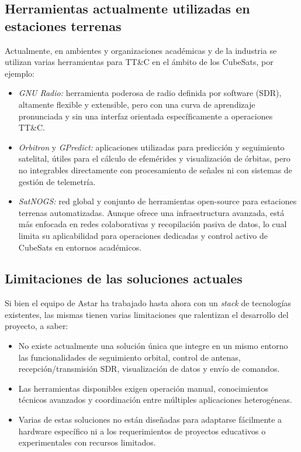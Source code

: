 \subsection*{Herramientas actualmente utilizadas en estaciones terrenas}

Actualmente, en ambientes y organizaciones académicas y de la industria se utilizan varias herramientas para TT\&C en el ámbito de los CubeSats, por ejemplo:

\begin{itemize}
    \item \textit{GNU Radio:} herramienta poderosa de radio definida por software (SDR), altamente flexible y extensible, pero con una curva de aprendizaje pronunciada y sin una interfaz orientada específicamente a operaciones TT\&C.
    
    \item \textit{Orbitron} y \textit{GPredict:} aplicaciones utilizadas para predicción y seguimiento satelital, útiles para el cálculo de efemérides y visualización de órbitas, pero no integrables directamente con procesamiento de señales ni con sistemas de gestión de telemetría.
    
    \item \textit{SatNOGS:} red global y conjunto de herramientas open-source para estaciones terrenas automatizadas. Aunque ofrece una infraestructura avanzada, está más enfocada en redes colaborativas y recopilación pasiva de datos, lo cual limita su aplicabilidad para operaciones dedicadas y control activo de CubeSats en entornos académicos.
\end{itemize}

\subsection*{Limitaciones de las soluciones actuales}

Si bien el equipo de Astar ha trabajado hasta ahora con un \textit{stack} de tecnologías existentes, las mismas tienen varias limitaciones que ralentizan el desarrollo del proyecto, a saber:

\begin{itemize}
    \item No existe actualmente una solución única que integre en un mismo entorno las funcionalidades de seguimiento orbital, control de antenas, recepción/transmisión SDR, visualización de datos y envío de comandos.
    
    \item Las herramientas disponibles exigen operación manual, conocimientos técnicos avanzados y coordinación entre múltiples aplicaciones heterogéneas.
    
    \item Varias de estas soluciones no están diseñadas para adaptarse fácilmente a hardware específico ni a los requerimientos de proyectos educativos o experimentales con recursos limitados.
\end{itemize}

